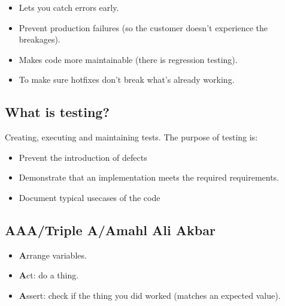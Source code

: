 \begin{itemize}
	\item Lets you catch errors early.
	\item Prevent production failures (so the customer doesn't experience the breakages).
	\item Makes code more maintainable (there is regression testing).
	\item To make sure hotfixes don't break what's already working.
\end{itemize}

\subsection{What is testing?}\label{sub:what_is_testing_}

Creating, executing and maintaining tests.
The purpose of testing is:
\begin{itemize}
	\item Prevent the introduction of defects
	\item Demonstrate that an implementation meets the required requirements.
	\item Document typical usecases of the code
\end{itemize}

\subsection{AAA/Triple A/Amahl Ali Akbar}\label{sub:aaa_triple_a_amahl_ali_akbar}

\begin{itemize}
	\item \textbf{A}rrange variables.
	\item \textbf{A}ct: do a thing.
	\item \textbf{A}ssert: check if the thing you did worked (matches an expected value).
\end{itemize}
